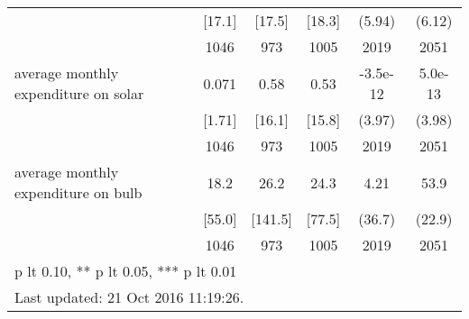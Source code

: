 \begin{table}[htbp]
\begin{tabular*}{0.9\hsize}{@{\hskip\tabcolsep\extracolsep\fill}l*{1}{ccccc}}
                                &   [17.1]&   [17.5]&   [18.3]&   (5.94)         &   (6.12)         \\
                                &     1046&      973&     1005&     2019         &     2051         \\
average monthly expenditure on solar&    0.071&     0.58&     0.53& -3.5e-12         &  5.0e-13         \\
                                &   [1.71]&   [16.1]&   [15.8]&   (3.97)         &   (3.98)         \\
                                &     1046&      973&     1005&     2019         &     2051         \\
average monthly expenditure on bulb&     18.2&     26.2&     24.3&     4.21         &     53.9\sym{**} \\
                                &   [55.0]&  [141.5]&   [77.5]&   (36.7)         &   (22.9)         \\
                                &     1046&      973&     1005&     2019         &     2051         \\
\bottomrule
\multicolumn{6}{l}{\footnotesize * p lt 0.10, ** p lt 0.05, *** p lt 0.01}\\
\multicolumn{6}{l}{\footnotesize Last updated: 21 Oct 2016 11:19:26.}\\
\end{tabular*}
\end{table}
